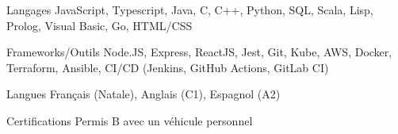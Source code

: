 
\begin{cvskills}
  \cvskill
    {Langages} %
    {JavaScript, Typescript, Java, C, C++, Python, SQL, Scala, Lisp, Prolog, Visual Basic, Go, HTML/CSS} %

  \cvskill
    {Frameworks/Outils} %
    {Node.JS, Express, ReactJS, Jest, Git, Kube, AWS, Docker, Terraform, Ansible, CI/CD (Jenkins, GitHub Actions, GitLab CI)} %
    
  \cvskill
    {Langues} %
    {Français (Natale), Anglais (C1), Espagnol (A2)} %
    
  \cvskill
    {Certifications} %
    {Permis B avec un véhicule personnel} %
\end{cvskills}
